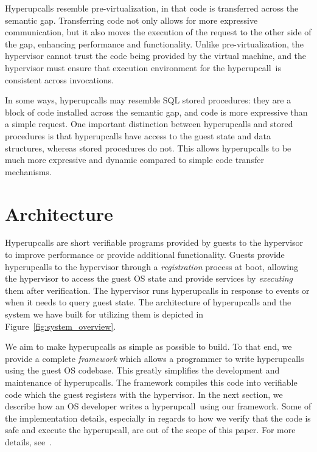 \documentclass[11pt]{article}
\newcommand{\Hypercallback}{Hyperupcall\xspace{}}
\newcommand{\hypercallback}{hyperupcall\xspace{}}
\begin{document}
\Hypercallback{}s resemble pre-virtualization, in that code is transferred across the semantic gap. Transferring code not only allows for more expressive communication, but it also moves the execution of the request to the other side of the gap, enhancing performance and functionality. Unlike pre-virtualization, the hypervisor cannot trust the code being provided by the virtual machine, and the hypervisor must ensure that execution environment for the \hypercallback~is consistent across invocations.

In some ways, hyperupcalls may resemble SQL stored procedures: they are a block of code installed across
the semantic gap, and code is more expressive than a simple request. One important distinction between
hyperupcalls and stored procedures is that hyperupcalls have access to the guest state and data structures,
whereas stored procedures do not. This allows hyperupcalls to be much more expressive and dynamic compared
to simple code transfer mechanisms.

    
\section{Architecture}
\label{sec:architecture}




\Hypercallback{}s are short verifiable programs provided by
guests to the hypervisor to improve performance 
or provide additional functionality. Guests provide \hypercallback{s}
to the hypervisor through a \emph{registration} process at boot, allowing
the hypervisor to access the guest OS state and provide services by \emph{executing} them
after verification. The hypervisor runs \hypercallback{}s 
in response to events or when it needs to
query guest state. The architecture
of \hypercallback{}s and the system we have built for utilizing them is depicted in Figure~\ref{fig:system_overview}.

We aim to make \hypercallback{}s as simple as possible to build. To that end, 
we provide a complete \emph{framework} which allows a programmer to write
\hypercallback{}s using the guest OS codebase. This greatly simplifies the development and maintenance of 
\hypercallback{}s. The framework compiles this code into verifiable code which the
guest registers with the hypervisor. In the next section, we describe how an OS
developer writes a \hypercallback~using our framework. Some of the implementation details, especially in regards
to how we verify that the code is safe and execute the hyperupcall, are out of the scope of this paper. For more details, see~\cite{amit2018design}.
\end{document}
